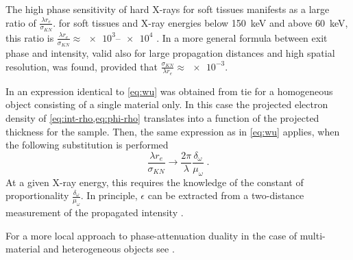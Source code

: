 \documentclass[
twoside,
openright,
titlepage,
numbers=noenddot,
headinclude,
fleqn,
a4paper,
footinclude=true,
cleardoublepage=empty,
abstractoff,
BCOR=5mm,
paper=a4,
fontsize=11pt,
british,ngerman,american,
]{scrreprt}
\begin{document}
The high phase sensitivity of hard X-rays for soft tissues manifests
as a large ratio of $\frac{\lambda r_e}{\sigma_{KN}}$. \Eg{} for soft
tissues and X-ray energies below \SI{150}{keV} and above \SI{60}{keV},
this ratio is $\frac{\lambda
  r_e}{\sigma_{KN}}\approx\numrange{e3}{e4}$ \cite{Wu2005,Wu2009}.  In
\cite{Wu2009} a more general formula between exit phase and intensity,
valid also for large propagation distances and high spatial
resolution, was found, provided that $\frac{\sigma_{KN}}{\lambda
  r_e}\approx\num{e-3}$.

In \cite{Paganin2002jmicro} an expression identical to \cref{eq:wu}
was obtained from \ac{tie} for a homogeneous object consisting of a
single material only.  In this case the projected electron density of
\cref{eq:int-rho,eq:phi-rho} translates into a function of the
projected thickness for the sample.  Then, the same expression as in
\cref{eq:wu} applies, when the following substitution is performed
\begin{equation}
  \label{eq:correspondence}
  \frac{\lambda r_e}{\sigma_{KN}} \to 
  \frac{2\pi}{\lambda}\frac{\delta_\omega}{\mu_\omega} \;.
\end{equation}
At a given X-ray energy, this requires the knowledge of the constant
of proportionality $\frac{\delta_\omega}{\mu_\omega}$.  In principle,
$\epsilon$ can be extracted from a two-distance measurement of
the propagated intensity \cite{Chen2011}.

For a more local approach to  phase-attenuation duality in the case
of multi-material and heterogeneous objects see
\cite{Langer2012,Langer2014}.
\end{document}
